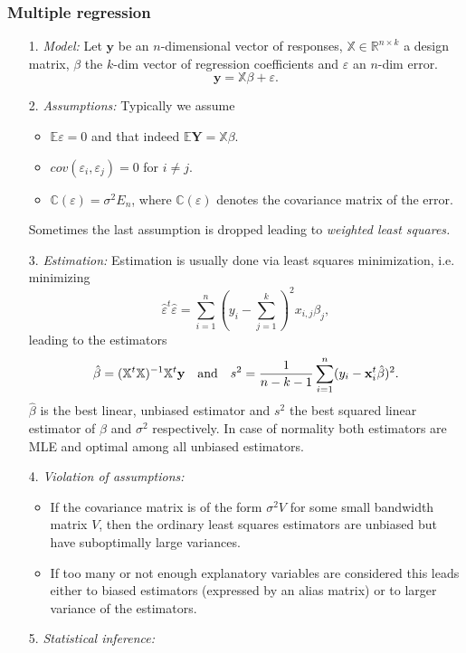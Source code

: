 \documentclass[12pt,a4paper]{amsart}
\theoremstyle{definition}
\theoremstyle{remark}
\numberwithin{equation}{section}
\begin{document}
\subsubsection{Multiple regression}

\begin{itemize}
\item[1.] \textit{Model:} Let $\mathbf{y}$ be an $n$-dimensional vector of responses, $ \mathbb{X}\in \mathbb{R}^{n \times k}$ a design matrix, $\beta$ the $k$-dim vector of regression coefficients and $\varepsilon$ an $n$-dim error. 
$$\mathbf{y}=\mathbb{X}\beta+\varepsilon.$$
\item[2.] \textit{Assumptions:} Typically we assume 
\begin{itemize}
\item $\mathbb{E}\varepsilon=0$ and that indeed $\mathbb{E}\mathbf{Y}= \mathbb{X}\beta$.
\item $cov(\varepsilon_i, \varepsilon_j)=0$ for $i \neq j$. 
\item $\mathbb{C}(\varepsilon)=\sigma^2 E_n$, where $\mathbb{C}(\varepsilon)$ denotes the covariance matrix of the error.
\end{itemize}
Sometimes the last assumption is dropped leading to \textit{weighted least squares.}
\item[3.] \textit{Estimation:} Estimation is usually done via least squares minimization, i.e. minimizing
$$\hat{\varepsilon}^t\hat{\varepsilon}=\sum_{i=1}^n (y_i-\sum_{j=1}^k)^2 x_{i,j} \beta_j,$$
leading to the estimators 
$$\hat{\beta}=(\mathbb{X}^t\mathbb{X})^{-1}\mathbb{X}^t \mathbf{y} \quad \textnormal{and} \quad s^2= \frac{1}{n-k-1} \sum_{i=1}^n (y_i-\mathbf{x}_i^t \hat{\beta})^2.$$
$\hat{\beta}$ is the best linear, unbiased estimator and $s^2$ the best squared linear estimator of $\beta$ and $\sigma^2$ respectively. In case of normality both estimators are MLE and optimal among all unbiased estimators.
\item[4.] \textit{Violation of assumptions:} 
\begin{itemize}
\item If the covariance matrix is of the form $\sigma^2 V$ for some small bandwidth matrix $V$, then the ordinary least squares estimators are unbiased but have suboptimally large variances.
\item If too many or not enough explanatory variables are considered this leads either to biased estimators (expressed by an alias matrix) or to larger variance of the estimators.
\end{itemize}
\item[5.] \textit{Statistical inference:} 

\end{itemize}
\end{document}
